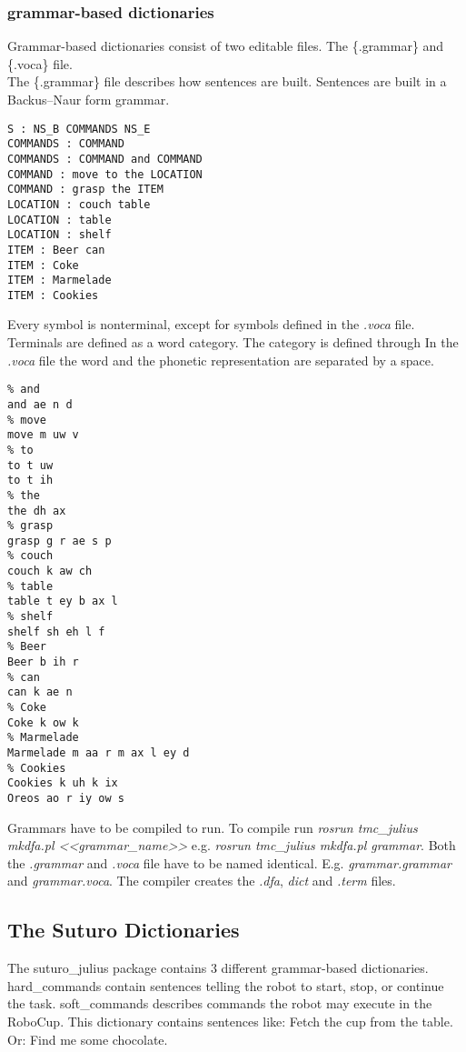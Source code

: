 \documentclass[main.tex]{subfiles}
\begin{document}
    \subsubsection{grammar-based dictionaries}
        Grammar-based dictionaries consist of two editable files. The \{.grammar\} and \{.voca\} file.\\
        The \{.grammar\} file describes how sentences are built. Sentences are built in a Backus–Naur form grammar.\\
        \begin{lstlisting}
S : NS_B COMMANDS NS_E
COMMANDS : COMMAND
COMMANDS : COMMAND and COMMAND
COMMAND : move to the LOCATION
COMMAND : grasp the ITEM
LOCATION : couch table
LOCATION : table
LOCATION : shelf
ITEM : Beer can
ITEM : Coke
ITEM : Marmelade
ITEM : Cookies
        \end{lstlisting}
        Every symbol is nonterminal, except for symbols defined in the \textit{.voca} file. Terminals are defined as a word category. The category is defined through \newline
        In the \textit{.voca} file the word and the phonetic representation are separated by a space.
        \begin{lstlisting}
% and
and ae n d
% move
move m uw v
% to
to t uw
to t ih
% the
the dh ax
% grasp
grasp g r ae s p
% couch
couch k aw ch
% table
table t ey b ax l
% shelf
shelf sh eh l f
% Beer
Beer b ih r
% can
can k ae n
% Coke
Coke k ow k
% Marmelade
Marmelade m aa r m ax l ey d
% Cookies
Cookies k uh k ix
Oreos ao r iy ow s
        \end{lstlisting}
        
        Grammars have to be compiled to run. To compile run \textit{rosrun tmc\_julius mkdfa.pl <<grammar\_name>>} e.g. \textit{rosrun tmc\_julius mkdfa.pl grammar}. Both the \textit{.grammar} and \textit{.voca} file have to be named identical. E.g. \textit{grammar.grammar} and \textit{grammar.voca}. The compiler creates the \textit{.dfa}, \textit{dict} and \textit{.term} files.	
    
    \subsection{The Suturo Dictionaries}
        The suturo\_julius package contains 3 different grammar-based dictionaries. hard\_commands contain sentences telling the robot to start, stop, or continue the task.
        soft\_commands describes commands the robot may execute in the RoboCup. This dictionary contains sentences like: Fetch the cup from the table. Or: Find me some chocolate.
\end{document}
